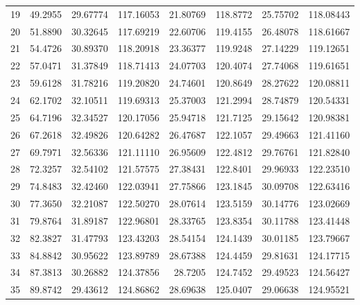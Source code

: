\begin{table}[ht!]
{\begin{tabular}{@{}rrrrrrrr@{}}
19 & 49.2955 & 29.67774 & 117.16053 & 21.80769 & 118.8772 & 25.75702 & 118.08443 \\
20 & 51.8890 & 30.32645 & 117.69219 & 22.60706 & 119.4155 & 26.48078 & 118.61667 \\
21 & 54.4726 & 30.89370 & 118.20918 & 23.36377 & 119.9248 & 27.14229 & 119.12651 \\
22 & 57.0471 & 31.37849 & 118.71413 & 24.07703 & 120.4074 & 27.74068 & 119.61651 \\
23 & 59.6128 & 31.78216 & 119.20820 & 24.74601 & 120.8649 & 28.27622 & 120.08811 \\
24 & 62.1702 & 32.10511 & 119.69313 & 25.37003 & 121.2994 & 28.74879 & 120.54331 \\
25 & 64.7196 & 32.34527 & 120.17056 & 25.94718 & 121.7125 & 29.15642 & 120.98381 \\
26 & 67.2618 & 32.49826 & 120.64282 & 26.47687 & 122.1057 & 29.49663 & 121.41160 \\
27 & 69.7971 & 32.56336 & 121.11110 & 26.95609 & 122.4812 & 29.76761 & 121.82840 \\
28 & 72.3257 & 32.54102 & 121.57575 & 27.38431 & 122.8401 & 29.96933 & 122.23510 \\
29 & 74.8483 & 32.42460 & 122.03941 & 27.75866 & 123.1845 & 30.09708 & 122.63416 \\
30 & 77.3650 & 32.21087 & 122.50270 & 28.07614 & 123.5159 & 30.14776 & 123.02669 \\
31 & 79.8764 & 31.89187 & 122.96801 & 28.33765 & 123.8354 & 30.11788 & 123.41448 \\
32 & 82.3827 & 31.47793 & 123.43203 & 28.54154 & 124.1439 & 30.01185 & 123.79667 \\
33 & 84.8842 & 30.95622 & 123.89789 & 28.67388 & 124.4459 & 29.81631 & 124.17715 \\
34 & 87.3813 & 30.26882 & 124.37856 & 28.7205  & 124.7452 & 29.49523 & 124.56427 \\
35 & 89.8742 & 29.43612 & 124.86862 & 28.69638 & 125.0407 & 29.06638 & 124.95521 \\ \bottomrule
\end{tabular}%
}
\end{table}
\vfill
\clearpage

